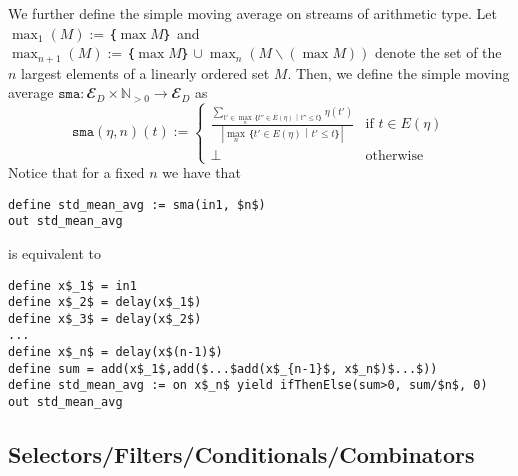 We further define the simple moving average on streams of arithmetic type.
Let $\max_1(M) := ｛\max M｝$ and $\max_{n+1}(M) := ｛\max M｝ ∪ \max_n (M∖(\max M))$ denote the set of the $n$ largest elements of a linearly ordered set $M$.  
Then, we define the simple moving average $\mathtt{sma}: 𝓔_D × ℕ_{>0} → 𝓔_D$ as
\[
   \mathtt{sma}(η,n)(t) := \begin{cases}
      \frac{∑_{t'∈ \max_n ｛t''∈E(η)｜t''≤t  ｝} η(t')}{|\max_n ｛t'∈E(η)｜t'≤t ｝|} & \text{if } t∈E(η)\\
      ⊥ & \text{otherwise}
    \end{cases}
\]
Notice that for a fixed $n$ we have that 
\begin{lstlisting}[language=tessla,mathescape]
define std_mean_avg := sma(in1, $n$)
out std_mean_avg
\end{lstlisting}
is equivalent to
\begin{lstlisting}[language=tessla,mathescape]
define x$_1$ = in1
define x$_2$ = delay(x$_1$)
define x$_3$ = delay(x$_2$)
...
define x$_n$ = delay(x$(n-1)$)
define sum = add(x$_1$,add($...$add(x$_{n-1}$, x$_n$)$...$))
define std_mean_avg := on x$_n$ yield ifThenElse(sum>0, sum/$n$, 0)
out std_mean_avg
\end{lstlisting}

\subsection{Selectors/Filters/Conditionals/Combinators}

